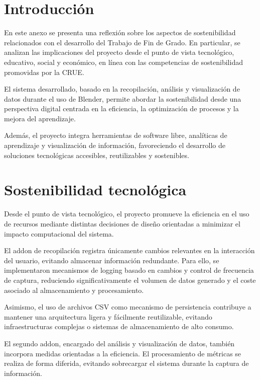 
\section{Introducción}

En este anexo se presenta una reflexión sobre los aspectos de sostenibilidad relacionados con el desarrollo del Trabajo de Fin de Grado. En particular, se analizan las implicaciones del proyecto desde el punto de vista tecnológico, educativo, social y económico, en línea con las competencias de sostenibilidad promovidas por la CRUE.

El sistema desarrollado, basado en la recopilación, análisis y visualización de datos durante el uso de Blender, permite abordar la sostenibilidad desde una perspectiva digital centrada en la eficiencia, la optimización de procesos y la mejora del aprendizaje.

Además, el proyecto integra herramientas de software libre, analíticas de aprendizaje y visualización de información, favoreciendo el desarrollo de soluciones tecnológicas accesibles, reutilizables y sostenibles.

\section{Sostenibilidad tecnológica}

Desde el punto de vista tecnológico, el proyecto promueve la eficiencia en el uso de recursos mediante distintas decisiones de diseño orientadas a minimizar el impacto computacional del sistema.

El addon de recopilación registra únicamente cambios relevantes en la interacción del usuario, evitando almacenar información redundante. Para ello, se implementaron mecanismos de logging basado en cambios y control de frecuencia de captura, reduciendo significativamente el volumen de datos generado y el coste asociado al almacenamiento y procesamiento.

Asimismo, el uso de archivos CSV como mecanismo de persistencia contribuye a mantener una arquitectura ligera y fácilmente reutilizable, evitando infraestructuras complejas o sistemas de almacenamiento de alto consumo.

El segundo addon, encargado del análisis y visualización de datos, también incorpora medidas orientadas a la eficiencia. El procesamiento de métricas se realiza de forma diferida, evitando sobrecargar el sistema durante la captura de información.

